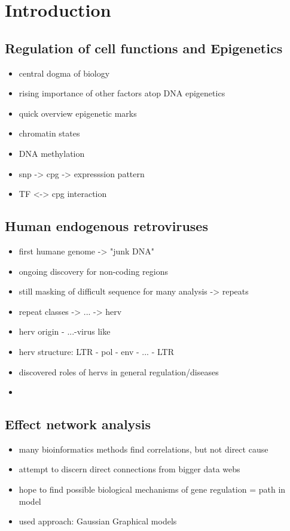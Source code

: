 \documentclass[a4paper,12pt]{article}
\begin{document}
\sectionfont{\LARGE}
\subsectionfont{\Large}
\subsubsectionfont{\Large}

\tableofcontents
\newpage

\section{Introduction}

\subsection{Regulation of cell functions and Epigenetics}
\begin{itemize}
\item central dogma of biology
\item rising importance of other factors atop DNA \textrightarrow epigenetics
\item quick overview epigenetic marks
\item chromatin states
\item DNA methylation 
\item snp -> cpg -> expresssion pattern
\item TF <-> cpg interaction
\end{itemize}


\subsection{Human endogenous retroviruses}
\begin{itemize}
\item first humane genome -> "junk DNA"
\item ongoing discovery for non-coding regions
\item still masking of difficult sequence for many analysis -> repeats
\item repeat classes -> ... -> herv
\item herv origin - ...-virus like 
\item herv structure: LTR - pol - env - ... - LTR
\item discovered roles of hervs in general regulation/diseases
\item 
\end{itemize}

\subsection{Effect network analysis}
\begin{itemize}
\item many bioinformatics methods find correlations, but not direct cause
\item attempt to discern direct connections from bigger data webs
\item hope to find possible biological mechanisms of gene regulation = path in model
\item used approach: Gaussian Graphical models
\end{itemize}
\end{document}
